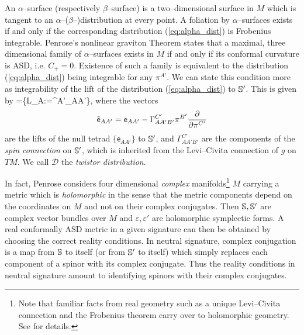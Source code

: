 An $\alpha$--surface (respectively $\beta$--surface) is a two--dimensional surface in $M$ which is tangent to an $\alpha$--($\beta$--)distribution at every point. A foliation by $\alpha$--surfaces exists if and only if the corresponding distribution (\ref{eq:alpha_dist}) is Frobenius integrable. Penrose's nonlinear graviton Theorem \cite{penrose} states that a 
maximal, three dimensional family of $\alpha$--surfaces exists in $M$ if and only if its conformal curvature is ASD, i.e. $C_+=0$. Existence of such a family is equivalent to the distribution (\ref{eq:alpha_dist}) being integrable for any $\pi^{A'}$. We can state this condition more as integrability of the lift of the distribution (\ref{eq:alpha_dist}) to $\mathbb{S}'$. This is given by
\be \label{eq:twistor_dist}
=\{L_A:=\pi^{A'}_{AA'}\},
\ee
where the vectors
\[
\tilde{\mathsf{e}}_{AA'}=\mathsf{e}_{AA'} - \Gamma^{C'}_{AA'B'}\pi^{B'}\frac{\partial}{\partial\pi^{C'}}
\]
are the lifts of the null tetrad $\{\mathsf{e}_{AA'}\}$ to $\mathbb{S}'$, and $\Gamma^{C'}_{AA'B'}$ are the components of the \textit{spin connection} on $\mathbb{S}'$, which is inherited from the Levi--Civita connection of $g$ on $TM$. We call $\mathcal{D}$ the \textit{twistor distribution}.

In fact, Penrose considers four dimensional \textit{complex} manifolds\footnote{Note that familiar facts from real geometry such as a unique Levi--Civita connection and the Frobenius theorem carry over to holomorphic geometry. See \cite{LeBrun83} for details.} $M$ carrying a metric which is \textit{holomorphic} in the sense that the metric components depend on the coordinates on $M$ and not on their complex conjugates. Then $\mathbb{S},\mathbb{S}'$ are complex vector bundles over $M$ and $\varepsilon,\varepsilon'$ are holomorphic symplectic forms. A real conformally ASD metric in a given signature can then be obtained by choosing the correct reality conditions. In neutral signature, complex conjugation is a map from $\mathbb{S}$ to itself (or from $\mathbb{S}'$ to itself) which simply replaces each component of a spinor with its complex conjugate. Thus the reality conditions in neutral signature amount to identifying spinors with their complex conjugates.

